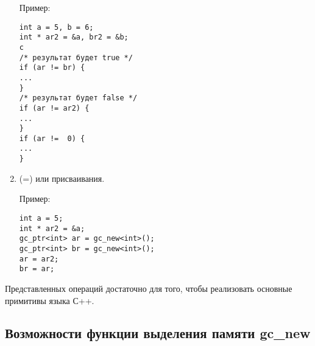 \begin{enumerate}
Пример:
\begin{lstlisting}
int a = 5, b = 6;
int * ar2 = &a, br2 = &b;
с
/* результат будет true */
if (ar != br) {
...	
}
/* результат будет false */
if (ar != ar2) {
...
}
if (ar !=  0) {
...
}
\end{lstlisting}

\item (=) или присваивания. 

Пример:
\begin{lstlisting}
int a = 5;
int * ar2 = &a;
gc_ptr<int> ar = gc_new<int>();
gc_ptr<int> br = gc_new<int>();
ar = ar2;
br = ar;
\end{lstlisting}

\end {enumerate}

Представленных операций достаточно для того, чтобы реализовать основные примитивы языка С++.

\subsection{ Возможности функции выделения памяти gc\_new}

